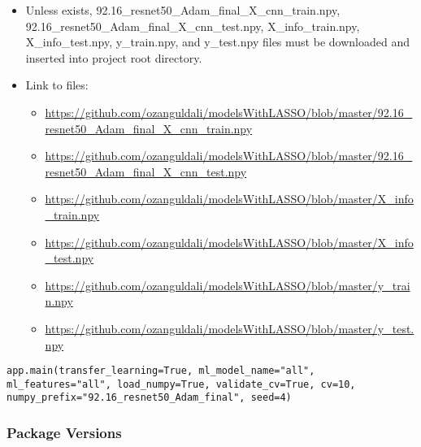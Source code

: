 \begin{enumerate}
	\begin{itemize}
		\itemsep1pt\parskip0pt
		\item
		Unless exists, 92.16\_resnet50\_Adam\_final\_X\_cnn\_train.npy,
		92.16\_resnet50\_Adam\_final\_X\_cnn\_test.npy, X\_info\_train.npy,
		X\_info\_test.npy, y\_train.npy, and y\_test.npy files must be
		downloaded and inserted into project root directory.\\
		\item
		Link to files:\\
		\begin{itemize}
			\item
			\url{https://github.com/ozanguldali/modelsWithLASSO/blob/master/92.16_resnet50_Adam_final_X_cnn_train.npy}\\
			\item
			\url{https://github.com/ozanguldali/modelsWithLASSO/blob/master/92.16_resnet50_Adam_final_X_cnn_test.npy}\\
			\item
			\url{https://github.com/ozanguldali/modelsWithLASSO/blob/master/X_info_train.npy}\\
			\item
			\url{https://github.com/ozanguldali/modelsWithLASSO/blob/master/X_info_test.npy}\\
			\item
			\url{https://github.com/ozanguldali/modelsWithLASSO/blob/master/y_train.npy}\\
			\item
			\url{https://github.com/ozanguldali/modelsWithLASSO/blob/master/y_test.npy}
		\end{itemize}
	\end{itemize}
	
	\texttt{app.main(transfer\_learning=True, ml\_model\_name="all", ml\_features="all", load\_numpy=True, validate\_cv=True, cv=10,          numpy\_prefix="92.16\_resnet50\_Adam\_final", seed=4)}
	
\end{enumerate}



\subsubsection*{Package Versions}\label{package-versions}

